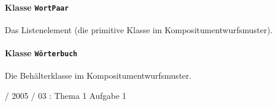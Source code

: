\documentclass{lehramt-informatik-haupt}
\begin{document}
\begin{itemize}
\begin{antwort}
\end{antwort}

%

\paragraph{Klasse \texttt{WortPaar}}

Das Listenelement (die primitive Klasse im Kompositumentwurfsmuster).

\begin{antwort}
\end{antwort}

%

\paragraph{Klasse \texttt{Wörterbuch}}

Die Behälterklasse im Kompositumentwurfsmuster.

\begin{antwort}
\end{antwort}

\end{itemize}

%

 / 2005 / 03 : Thema 1 Aufgabe 1

\literatur
\end{document}
